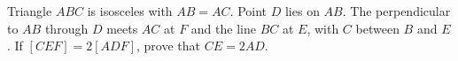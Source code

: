 Triangle $ABC$ is isosceles with $AB=AC$. Point $D$ lies on $AB$. The perpendicular to $AB$ through $D$ meets $AC$ at $F$ and the line $BC$ at $E$, with $C$ between $B$ and $E$. If $[CEF]=2[ADF]$, prove that $CE=2AD$.
